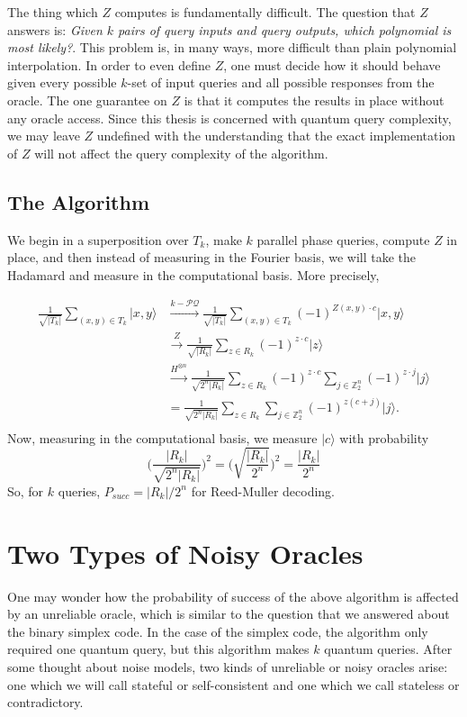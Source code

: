 \documentclass[12pt,twoside]{reedthesis}
\theoremstyle{definition}
\newlength{\arrow}
\newcommand{\Z}{\mathbb{Z}}
\newcommand{\ket}[1]{\ensuremath{\lvert #1\rangle}\xspace}
\begin{document}
The thing which $Z$ computes is fundamentally difficult. The question that $Z$ answers is: \textit{Given $k$ pairs of query inputs and query outputs, which polynomial is most likely?}. This problem is, in many ways, more difficult than plain polynomial interpolation. In order to even define $Z$, one must decide how it should behave given every possible $k$-set of input queries and all possible responses from the oracle. The one guarantee on $Z$ is that it computes the results in place without any oracle access. Since this thesis is concerned with quantum query complexity, we may leave $Z$ undefined with the understanding that the exact implementation of $Z$ will not affect the query complexity of the algorithm.

\subsection{The Algorithm}
We begin in a superposition over $T_k$, make $k$ parallel phase queries, compute $Z$ in place, and then instead of  measuring in the Fourier basis, we will take the Hadamard and measure in the computational basis. More precisely,

\begin{align*}
\frac{1}{\sqrt{\lvert T_k \rvert}} \sum_{(x,y) \in T_k} \ket{x,y}
& \xrightarrow{k-\mathcal{PQ}} \frac{1}{\sqrt{\lvert T_k \rvert}} \sum_{(x,y) \in T_k}  (-1)^{Z(x,y) \cdot c} \ket{x,y} \\
& \xrightarrow{Z} \frac{1}{\sqrt{\lvert R_k \rvert}} \sum_{z \in R_k} (-1)^{z\cdot c} \ket{z} \\
& \xrightarrow{H^{\otimes n}} \frac{1}{\sqrt{2^n \lvert R_k \rvert}} \sum_{z \in R_k} (-1)^{z \cdot c} \sum_{j \in \Z_2^n} (-1)^{z \cdot j} \ket{j} \\
& = \frac{1}{\sqrt{2^n \lvert R_k \rvert}}  \sum_{z \in R_k} \sum_{j \in \Z_2^n}(-1)^{z(c + j)}\ket{j}. \\
\end{align*}
Now, measuring in the computational basis, we measure $\ket{c}$ with probability 
\begin{equation*}
\bigg(\frac{\lvert R_k \rvert}{\sqrt{2^n \lvert R_k \rvert}}\bigg )^2 = \bigg (\sqrt{\frac{\lvert R_k \rvert}{2^n}} \bigg)^2 = \frac{\lvert R_k \rvert}{2^n}
\end{equation*}
So, for $k$ queries, $P_{succ} = \lvert R_k \rvert /2^n$ for Reed-Muller decoding.
\section{Two Types of Noisy Oracles}
One may wonder how the probability of success of the above algorithm is affected by an unreliable oracle, which is similar to the question that we answered about the binary simplex code. In the case of the simplex code, the algorithm only required one quantum query, but this algorithm makes $k$ quantum queries. After some thought about noise models, two kinds of unreliable or noisy oracles arise: one which we will call stateful or self-consistent and one which we call stateless or contradictory.
\end{document}
